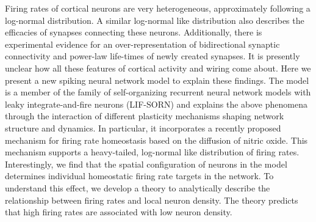 \documentclass[10pt,letterpaper]{article}
\begin{document}
%
Firing rates of cortical neurons are very heterogeneous, approximately following a log-normal distribution. A similar log-normal like distribution also describes the efficacies of synapses connecting these neurons. Additionally, there is experimental evidence for an over-representation of bidirectional synaptic connectivity and power-law life-times of newly created synapses. It is presently unclear how all these features of cortical activity and wiring come about. Here we present a new spiking neural network model to explain these findings. The model is a member of the family of self-organizing recurrent neural network models with leaky integrate-and-fire neurons (LIF-SORN) and explains the above phenomena through the interaction of different plasticity mechanisms shaping network structure and dynamics. In particular, it incorporates a recently proposed mechanism for firing rate homeostasis based on the diffusion of nitric oxide. This mechanism supports a heavy-tailed, log-normal like distribution of firing rates. Interestingly, we find that the spatial configuration of neurons in the model determines individual homeostatic firing rate targets in the network. To understand this effect, we develop a theory to analytically describe the relationship between firing rates and local neuron density. The theory predicts that high firing rates are associated with low neuron density.


\end{document}
